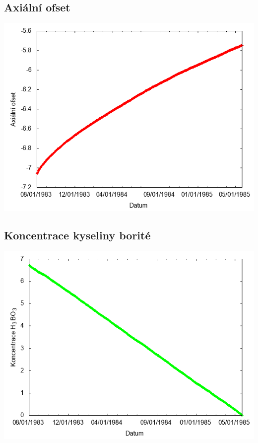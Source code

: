 \documentclass[a4paper,twoside,11pt]{article}
\begin{document}
\subsection*{Axiální ofset}
\begin{center}
\includegraphics[width=.8\textwidth]{graphs/Atlantis_09_ao.png}
\end{center}

\subsection*{Koncentrace kyseliny borité}
\begin{center}
\includegraphics[width=.8\textwidth]{graphs/Atlantis_09_bc.png}
\end{center}
\end{document}
